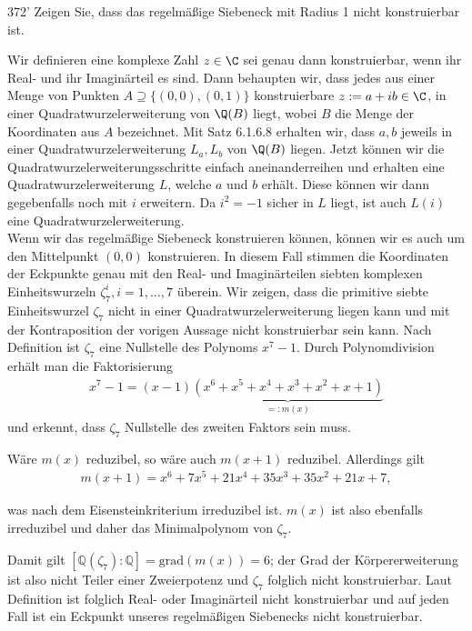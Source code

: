 \begin{algebraUE}{372'}
Zeigen Sie, dass das regelmäßige Siebeneck mit Radius 1 nicht konstruierbar ist.
\end{algebraUE}

\begin{solution}
  Wir definieren eine komplexe Zahl $z \in \C$ sei genau dann konstruierbar, wenn ihr
  Real- und ihr Imaginärteil es sind. Dann behaupten wir, dass jedes
  aus einer Menge von Punkten $A \supseteq \{(0,0),(0,1)\}$ konstruierbare $z := a + ib \in \C$,
  in einer Quadratwurzelerweiterung von $\Q(B)$ liegt, wobei
  $B$ die Menge der Koordinaten aus $A$ bezeichnet.
  Mit Satz 6.1.6.8 erhalten wir, dass $a,b$ jeweils in einer Quadratwurzelerweiterung $L_a,L_b$ von $\Q(B)$ liegen.
  Jetzt können wir die Quadratwurzelerweiterungsschritte einfach aneinanderreihen
  und erhalten eine Quadratwurzelerweiterung $L$, welche $a$ und $b$ erhält.
  Diese können wir dann gegebenfalls noch mit $i$ erweitern. Da $i^2 = -1$
  sicher in $L$ liegt, ist auch $L(i)$ eine Quadratwurzelerweiterung. \\
  Wenn wir das regelmäßige Siebeneck konstruieren können, können wir es auch um
  den Mittelpunkt $(0,0)$ konstruieren. In diesem Fall stimmen die Koordinaten der Eckpunkte genau
  mit den Real- und Imaginärteilen siebten komplexen Einheitswurzeln $\zeta_7^i, i = 1,\dots,7$ überein.
  Wir zeigen, dass die primitive siebte Einheitswurzel $\zeta_7$ nicht in einer
  Quadratwurzelerweiterung liegen kann und mit der Kontraposition der vorigen Aussage
  nicht konstruierbar sein kann. Nach Definition ist $\zeta_7$ eine Nullstelle des Polynoms $x^7-1.$ Durch Polynomdivision erhält man die Faktorisierung
  \begin{align}
      x^7-1 = (x-1)\underbrace{(x^6+x^5+x^4+x^3+x^2+x+1)}_{=: m(x)}
  \end{align}
  und erkennt, dass $\zeta_7$ Nullstelle des zweiten Faktors sein muss.

  Wäre $m(x)$ reduzibel, so wäre auch $m(x+1)$ reduzibel. Allerdings gilt
  \begin{align}
      m(x+1) = x^6+7x^5+21x^4+35x^3+35x^2+21x+7,
  \end{align}

  was nach dem Eisensteinkriterium irreduzibel ist. $m(x)$ ist also ebenfalls irreduzibel und daher das Minimalpolynom von $\zeta_7.$

  Damit gilt $[\mathbb{Q}(\zeta_7):\mathbb{Q}] = \mathrm{grad}(m(x)) = 6$; der Grad der Körpererweiterung ist also nicht Teiler einer Zweierpotenz und $\zeta_7$ folglich nicht konstruierbar. Laut Definition ist folglich Real- oder Imaginärteil nicht konstruierbar und auf jeden Fall
  ist ein Eckpunkt unseres regelmäßigen Siebenecks nicht konstruierbar.



\end{solution}
